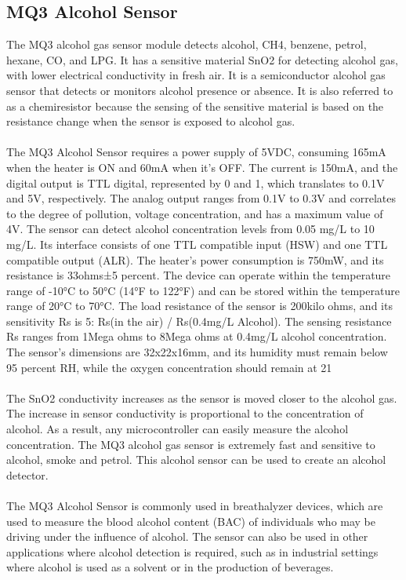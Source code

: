 \documentclass[12pt]{article}
\begin{document}
\subsection{MQ3 Alcohol Sensor}
The MQ3 alcohol gas sensor module detects alcohol, CH4, benzene, petrol, hexane, CO, and LPG. It has a sensitive material SnO2 for detecting alcohol gas, with lower electrical conductivity in fresh air. It is a semiconductor alcohol gas sensor that detects or monitors alcohol presence or absence. It is also referred to as a chemiresistor because the sensing of the sensitive material is based on the resistance change when the sensor is exposed to alcohol gas.
\\
\\
The MQ3 Alcohol Sensor requires a power supply of 5VDC, consuming 165mA when the heater is ON and 60mA when it's OFF. The current is 150mA, and the digital output is TTL digital, represented by 0 and 1, which translates to 0.1V and 5V, respectively. The analog output ranges from 0.1V to 0.3V and correlates to the degree of pollution, voltage concentration, and has a maximum value of 4V. The sensor can detect alcohol concentration levels from 0.05 mg/L to 10 mg/L. Its interface consists of one TTL compatible input (HSW) and one TTL compatible output (ALR). The heater's power consumption is 750mW, and its resistance is 33ohms±5 percent. The device can operate within the temperature range of -10°C to 50°C (14°F to 122°F) and can be stored within the temperature range of 20°C to 70°C. The load resistance of the sensor is 200kilo ohms, and its sensitivity Rs is 5: Rs(in the air) / Rs(0.4mg/L Alcohol). The sensing resistance Rs ranges from 1Mega ohms to 8Mega ohms at 0.4mg/L alcohol concentration. The sensor's dimensions are 32x22x16mm, and its humidity must remain below 95 percent RH, while the oxygen concentration should remain at 21%
\\
\\
The SnO2 conductivity increases as the sensor is moved closer to the alcohol gas. The increase in sensor conductivity is proportional to the concentration of alcohol. As a result, any microcontroller can easily measure the alcohol concentration. The MQ3 alcohol gas sensor is extremely fast and sensitive to alcohol, smoke and petrol. This alcohol sensor can be used to create an alcohol detector.
\\
\\
The MQ3 Alcohol Sensor is commonly used in breathalyzer devices, which are used to measure the blood alcohol content (BAC) of individuals who may be driving under the influence of alcohol. The sensor can also be used in other applications where alcohol detection is required, such as in industrial settings where alcohol is used as a solvent or in the production of beverages.
\\
\\
\end{document}
